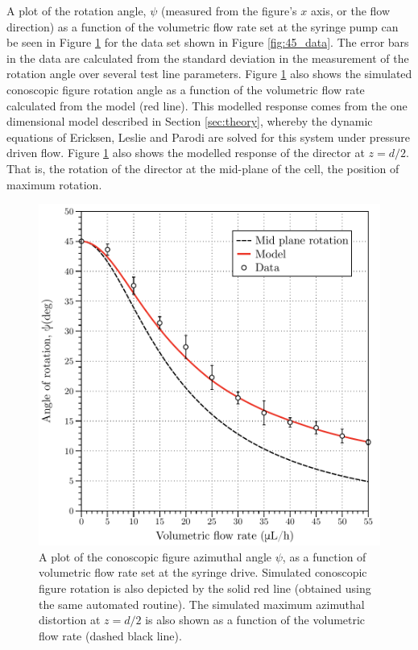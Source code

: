 A plot of the rotation angle, $\psi$ (measured from the figure's $x$ axis, or the flow direction) as a function of the volumetric flow rate set at the syringe pump can be seen in Figure \ref{fig:45_data_plot} for the data set shown in Figure \ref{fig:45_data}. The error bars in the data are calculated from the standard deviation in the measurement of the rotation angle over several test line parameters. Figure \ref{fig:45_data_plot} also shows the simulated conoscopic figure rotation angle as a function of the volumetric flow rate calculated from the model (red line). This modelled response comes from the one dimensional model described in Section \ref{sec:theory}, whereby the dynamic equations of Ericksen, Leslie and Parodi are solved for this system under pressure driven flow. Figure \ref{fig:45_data_plot} also shows the modelled response of the director at $z=d/2$. That is, the rotation of the director at the mid-plane of the cell, the position of maximum rotation.

\begin{figure}
\begin{center}
\includegraphics{Figures/45/45_data1}
\end{center}
\caption[Conoscopic figure rotation as a function of volumetric flow rate ($\phi_0=45^{\circ}$)]{\label{fig:45_data_plot}A plot of the conoscopic figure azimuthal angle $\psi$, as a function of volumetric flow rate set at the syringe drive. Simulated conoscopic figure rotation is also depicted by the solid red line (obtained using the same automated routine). The simulated maximum azimuthal distortion at $z=d/2$ is also shown as a function of the volumetric flow rate (dashed black line).}
\end{figure}

